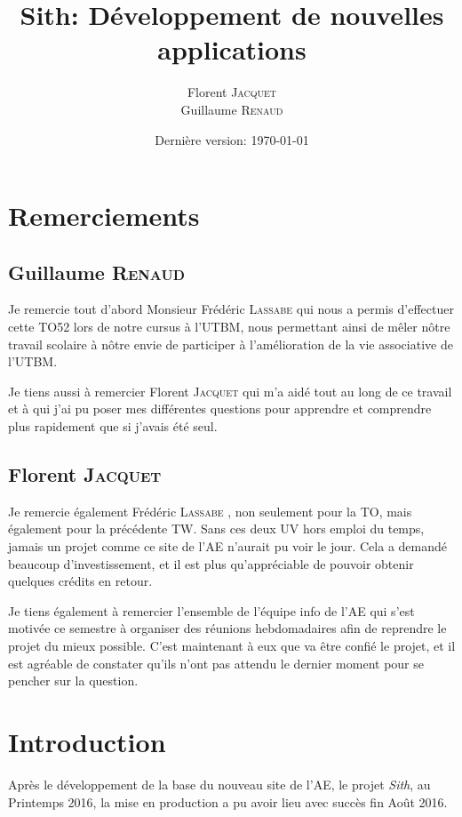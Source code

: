 \documentclass[a4paper]{report}
\title{Sith: Développement de nouvelles applications}
\author{Florent \textsc{Jacquet}\\
Guillaume \textsc{Renaud}}
\date{Dernière version: \today}
\begin{document}


\tableofcontents

\chapter*{Remerciements}
\section*{Guillaume \textsc{Renaud}}
\par Je remercie tout d'abord Monsieur Frédéric \textsc{Lassabe}  qui nous a permis d'effectuer cette TO52 lors de notre cursus à
l'UTBM, nous permettant ainsi de mêler nôtre travail scolaire à nôtre envie de participer à l'amélioration de la vie
associative de l'UTBM.

\par Je tiens aussi à remercier Florent \textsc{Jacquet}  qui m'a aidé tout au long de ce travail et à qui j'ai pu poser mes
différentes questions pour apprendre et comprendre plus rapidement que si j'avais été seul.

\section*{Florent \textsc{Jacquet}}
\par Je remercie également Frédéric \textsc{Lassabe} , non seulement pour la TO, mais également pour la précédente TW. Sans ces
deux UV hors emploi du temps, jamais un projet comme ce site de l'AE n'aurait pu voir le jour. Cela a demandé beaucoup
d'investissement, et il est plus qu'appréciable de pouvoir obtenir quelques crédits en retour.

\par Je tiens également à remercier l'ensemble de l'équipe info de l'AE qui s'est motivée ce semestre à organiser des
réunions hebdomadaires afin de reprendre le projet du mieux possible. C'est maintenant à eux que va être confié le
projet, et il est agréable de constater qu'ils n'ont pas attendu le dernier moment pour se pencher sur la question.


\chapter*{Introduction}
\par Après le développement de la base du nouveau site de l'AE, le projet \emph{Sith}, au Printemps 2016, la mise en
production a pu avoir lieu avec succès fin Août 2016.
\end{document}
